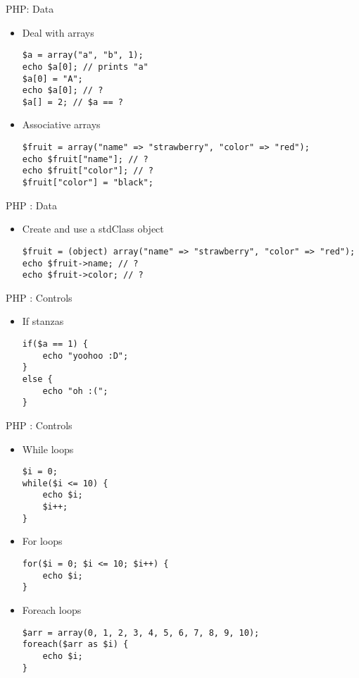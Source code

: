 \documentclass{beamer}
\begin{document}
\begin{frame}[fragile]{PHP: Data}
    \begin{itemize}
        \item Deal with arrays
        \begin{lstlisting}
$a = array("a", "b", 1);
echo $a[0]; // prints "a"
$a[0] = "A";
echo $a[0]; // ?
$a[] = 2; // $a == ?
        \end{lstlisting}
        \item Associative arrays
        \begin{lstlisting}
$fruit = array("name" => "strawberry", "color" => "red");
echo $fruit["name"]; // ?
echo $fruit["color"]; // ?
$fruit["color"] = "black";
        \end{lstlisting}
    \end{itemize}
\end{frame}

\begin{frame}[fragile]{PHP : Data}
    \begin{itemize}
        \item Create and use a stdClass object
        \begin{lstlisting}
$fruit = (object) array("name" => "strawberry", "color" => "red");
echo $fruit->name; // ?
echo $fruit->color; // ?
        \end{lstlisting}
    \end{itemize}
\end{frame}

\begin{frame}[fragile]{PHP : Controls}
    \begin{itemize}
        \item If stanzas
        \begin{lstlisting}
if($a == 1) {
    echo "yoohoo :D";
}
else {
    echo "oh :(";
}

        \end{lstlisting}
    \end{itemize}
\end{frame}

\begin{frame}[fragile]{PHP : Controls}
    \begin{itemize}
        \item While loops
        \begin{lstlisting}
$i = 0;
while($i <= 10) {
    echo $i;
    $i++;
}
        \end{lstlisting}
        \item For loops
        \begin{lstlisting}
for($i = 0; $i <= 10; $i++) {
    echo $i;
}
        \end{lstlisting}
        \item Foreach loops
        \begin{lstlisting}
$arr = array(0, 1, 2, 3, 4, 5, 6, 7, 8, 9, 10);
foreach($arr as $i) {
    echo $i;
}
        \end{lstlisting}
    \end{itemize}
\end{frame}
\end{document}
